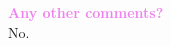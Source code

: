 \documentclass{article}
\newcommand{\sectioncolor}{Violet}
\begin{document}
    \textcolor{\sectioncolor}{\textbf{
    Any other comments?
    }} \\
    No. \\

\newpage



\end{document}

